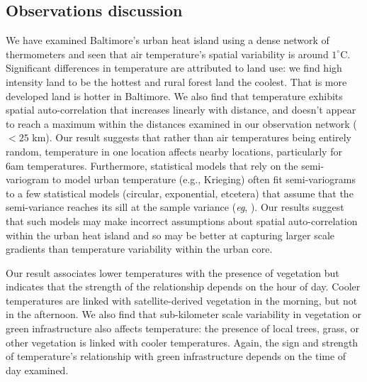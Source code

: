 \subsection{Observations discussion}
We have examined Baltimore's urban heat island using a dense network of thermometers and seen that air temperature's spatial variability is around $1^\circ$C. Significant differences in temperature are attributed to land use: we find high intensity land to be the hottest and rural forest land the coolest. That is more developed land is hotter in Baltimore. We also find that temperature exhibits spatial auto-correlation that increases linearly with distance, and doesn't appear to reach a maximum within the distances examined in our observation network ($<25$ km). 
 Our result suggests that rather than air temperatures being entirely random, temperature in one location affects nearby locations, particularly for 6am temperatures. Furthermore, statistical models that rely on the semi-variogram to model urban temperature (e.g., Krieging) often fit semi-variograms to a few statistical models (circular, exponential, etcetera) that assume that the semi-variance reaches its sill at the sample variance (\textit{eg}, \cite{hardin2017urban}). 
 Our results suggest that such models may make incorrect assumptions about spatial auto-correlation within the urban heat island and so may be better at capturing larger scale gradients than temperature variability within the urban core.
 
  

Our result associates lower temperatures with the presence of vegetation but indicates that the strength of the relationship depends on the hour of day. Cooler temperatures are linked with satellite-derived vegetation in the morning, but not in the afternoon.  We also find that sub-kilometer scale variability in vegetation or green infrastructure also affects temperature: the presence of local trees, grass, or other vegetation is linked with cooler temperatures. Again, the sign and strength of temperature's relationship with green infrastructure depends on the time of day examined. 

